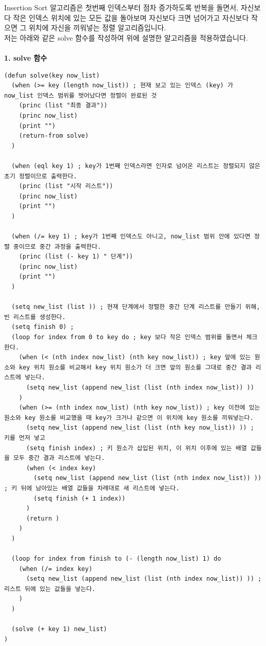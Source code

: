 \documentclass{article}
\begin{document}
\quad Insertion Sort 알고리즘은 첫번째 인덱스부터 점차 증가하도록 반복을 돌면서, 자신보다 작은 인덱스 위치에 있는 모든 값을 돌아보며 자신보다 크면 넘어가고 자신보다 작으면 그 위치에 자신을 끼워넣는 정렬 알고리즘입니다.\\
저는 아래와 같은 solve 함수를 작성하여 위에 설명한 알고리즘을 적용하였습니다.\\\\
\textbf{1. solve 함수}\\
\begin{verbatim}
(defun solve(key now_list)
  (when (>= key (length now_list)) ; 현재 보고 있는 인덱스 (key) 가 now_list 인덱스 범위를 벗어났다면 정렬이 완료된 것
    (princ (list "최종 결과"))
    (princ now_list)
    (print "")
    (return-from solve)
  )

  (when (eql key 1) ; key가 1번째 인덱스라면 인자로 넘어온 리스트는 정렬되지 않은 초기 정렬이므로 출력한다.
    (princ (list "시작 리스트"))
    (princ now_list)
    (print "")
  )

  (when (/= key 1) ; key가 1번째 인덱스도 아니고, now_list 범위 안에 있다면 정렬 중이므로 중간 과정을 출력한다.
    (princ (list (- key 1) " 단계"))
    (princ now_list)
    (print "")
  )
  
  (setq new_list (list )) ; 현재 단계에서 정렬한 중간 단계 리스트를 만들기 위해, 빈 리스트를 생성한다.
  (setq finish 0) ; 
  (loop for index from 0 to key do ; key 보다 작은 인덱스 범위를 돌면서 체크한다.
    (when (< (nth index now_list) (nth key now_list)) ; key 앞에 있는 원소와 key 위치 원소를 비교해서 key 위치 원소가 더 크면 앞의 원소를 그대로 중간 결과 리스트에 넣는다.
      (setq new_list (append new_list (list (nth index now_list)) ))
    )
    (when (>= (nth index now_list) (nth key now_list)) ; key 이전에 있는 원소와 key 원소를 비교했을 때 key가 크거나 같으면 이 위치에 key 원소를 끼워넣는다.
      (setq new_list (append new_list (list (nth key now_list)) )) ; 키를 먼저 넣고
      (setq finish index) ; 키 원소가 삽입된 위치, 이 위치 이후에 있는 배열 값들을 모두 중간 결과 리스트에 넣는다.
      (when (< index key)
        (setq new_list (append new_list (list (nth index now_list)) )) ; 키 뒤에 남아있는 배열 값들을 차례대로 새 리스트에 넣는다.
        (setq finish (+ 1 index))
      )
      (return )
    )
  )

  (loop for index from finish to (- (length now_list) 1) do
    (when (/= index key)
      (setq new_list (append new_list (list (nth index now_list)) )) ; 리스트 뒤에 있는 값들을 넣는다.
    )
  )

  (solve (+ key 1) new_list)
)
\end{verbatim}
\end{document}
